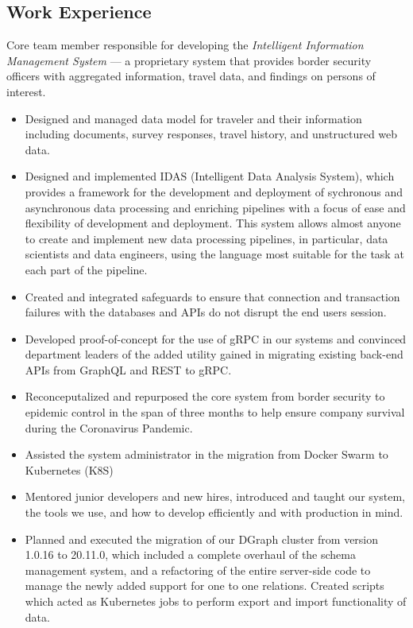 \documentclass{adk_cv}
\begin{document}
\begin{minipage}[t]{\dimexpr.62\linewidth}
\begin{flushleft}
\section{Work Experience}
Core team member responsible for developing the \textit{Intelligent Information Management System} --- 
a proprietary system that provides border security officers with aggregated information, travel data, and 
findings on persons of interest.
\begin{itemize}[left=0pt]
    \item Designed and managed data model for traveler and their information including documents, survey responses, travel history, and unstructured web data.
    \item Designed and implemented IDAS (Intelligent Data Analysis System), which provides a framework for the development and deployment of sychronous and asynchronous data processing and enriching pipelines with a focus of ease and flexibility of development and deployment. This system allows almost anyone to create and implement new data processing pipelines, in particular, data scientists and data engineers, using the language most suitable for the task at each part of the pipeline.
    \item Created and integrated safeguards to ensure that connection and transaction failures with the databases and APIs do not disrupt the end users session.
    \item Developed proof-of-concept for the use of gRPC in our systems and convinced department leaders of the added utility gained in migrating existing back-end APIs from GraphQL and REST to gRPC.
    \item Reconceputalized and repurposed the core system from border security to epidemic control in the span of three months to help ensure company survival during the Coronavirus Pandemic.
    \item Assisted the system administrator in the migration from Docker Swarm to Kubernetes (K8S)
    \item Mentored junior developers and new hires, introduced and taught our system, the tools we use, and how to develop efficiently and with production in mind.
    \item Planned and executed the migration of our DGraph cluster from version 1.0.16 to 20.11.0, which included a complete overhaul of the schema management system, and a refactoring of the entire server-side code to manage the newly added support for one to one relations. Created scripts which acted as Kubernetes jobs to perform export and import functionality of data.
\end{itemize}
\end{flushleft}
\end{minipage}
\end{document}
